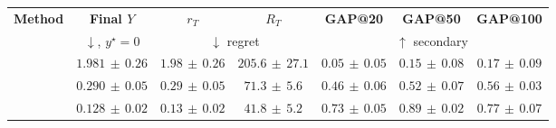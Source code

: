 \begin{tabular}{@{}lcccccc@{}}
\toprule
\textbf{Method} & \textbf{Final $Y$} & $r_T$ & $R_T$ & \textbf{GAP@20} & \textbf{GAP@50} & \textbf{GAP@100} \\
\multicolumn{1}{c}{} & {\footnotesize $\downarrow$, $y^\star{=}0$} & \multicolumn{2}{c}{\footnotesize $\downarrow$ regret} & \multicolumn{3}{c}{\footnotesize $\uparrow$ secondary} \\
\midrule
\BO{} & $1.981{\scriptstyle\,\pm\,}0.26$ & $1.98{\scriptstyle\,\pm\,}0.26$ & $205.6{\scriptstyle\,\pm\,}27.1$ & $0.05{\scriptstyle\,\pm\,}0.05$ & $0.15{\scriptstyle\,\pm\,}0.08$ & $0.17{\scriptstyle\,\pm\,}0.09$ \\
\CBO{} & $0.290{\scriptstyle\,\pm\,}0.05$ & $0.29{\scriptstyle\,\pm\,}0.05$ & $71.3{\scriptstyle\,\pm\,}5.6$ & $0.46{\scriptstyle\,\pm\,}0.06$ & $0.52{\scriptstyle\,\pm\,}0.07$ & $0.56{\scriptstyle\,\pm\,}0.03$ \\
\textbf{\QCBO{}} & $0.128{\scriptstyle\,\pm\,}0.02$ & $0.13{\scriptstyle\,\pm\,}0.02$ & $41.8{\scriptstyle\,\pm\,}5.2$ & $0.73{\scriptstyle\,\pm\,}0.05$ & $0.89{\scriptstyle\,\pm\,}0.02$ & $0.77{\scriptstyle\,\pm\,}0.07$ \\
\bottomrule
\end{tabular}
